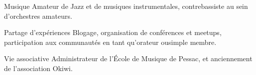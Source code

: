 

\begin{cvskills}

    \cvskill
      {Musique}
      {Amateur de Jazz et de musiques instrumentales, contrebassiste au sein d'orchestres amateurs.}

    \cvskill
      {Partage d'expériences}
      {Blogage, organisation de conférences et meetups, participation aux communautés en tant qu'orateur ou\newline simple membre.}

    \cvskill
      {Vie associative}
      {Administrateur de l'École de Musique de Pessac, et anciennement de l'association Okiwi.}

 \end{cvskills}
